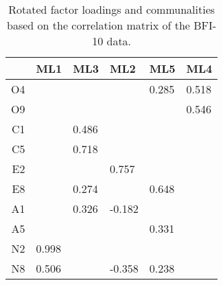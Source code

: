 \begin{table}[ht]
\centering
\begin{tabular}{rlllll}
  \toprule
 & {\textbf{ML1}} & {\textbf{ML3}} & {\textbf{ML2}} & {\textbf{ML5}} & {\textbf{ML4}} \\ 
  \midrule
O4 &        &        &        &  0.285 &  0.518 \\ 
  O9 &        &        &        &        &  0.546 \\ 
  C1 &        &  0.486 &        &        &        \\ 
  C5 &        &  0.718 &        &        &        \\ 
  E2 &        &        &  0.757 &        &        \\ 
  E8 &        &  0.274 &        &  0.648 &        \\ 
  A1 &        &  0.326 & -0.182 &        &        \\ 
  A5 &        &        &        &  0.331 &        \\ 
  N2 &  0.998 &        &        &        &        \\ 
  N8 &  0.506 &        & -0.358 &  0.238 &        \\ 
   \bottomrule
\end{tabular}
\caption{Rotated factor loadings and communalities based on the correlation matrix of the BFI-10 data.} 
\label{tab:loadingsbfi10}
\end{table}
